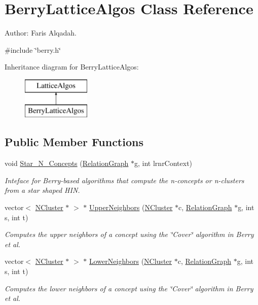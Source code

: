 \hypertarget{class_berry_lattice_algos}{
\section{BerryLatticeAlgos Class Reference}
\label{class_berry_lattice_algos}
}


Author: Faris Alqadah.  




{\ttfamily \#include \char`\"{}berry.h\char`\"{}}

Inheritance diagram for BerryLatticeAlgos:\begin{figure}[H]
\begin{center}
\leavevmode
\includegraphics[height=2.000000cm]{class_berry_lattice_algos}
\end{center}
\end{figure}
\subsection*{Public Member Functions}
\begin{DoxyCompactItemize}
\item 
void \hyperlink{class_berry_lattice_algos_aa740db0f43531fc872f94c062efe59b9}{Star\_\-N\_\-Concepts} (\hyperlink{class_relation_graph}{RelationGraph} $\ast$g, int lrnrContext)
\begin{DoxyCompactList}\small\item\em Inteface for Berry-\/based algorithms that compute the n-\/concepts or n-\/clusters from a star shaped HIN. \item\end{DoxyCompactList}\item 
vector$<$ \hyperlink{class_n_cluster}{NCluster} $\ast$ $>$ $\ast$ \hyperlink{class_berry_lattice_algos_a22c1daa784e7bf5017a40b313fcec221}{UpperNeighbors} (\hyperlink{class_n_cluster}{NCluster} $\ast$c, \hyperlink{class_relation_graph}{RelationGraph} $\ast$g, int s, int t)
\begin{DoxyCompactList}\small\item\em Computes the upper neighbors of a concept using the \char`\"{}Cover\char`\"{} algorithm in Berry et al. \item\end{DoxyCompactList}\item 
vector$<$ \hyperlink{class_n_cluster}{NCluster} $\ast$ $>$ $\ast$ \hyperlink{class_berry_lattice_algos_af33af014732c42bf75864cb492184104}{LowerNeighbors} (\hyperlink{class_n_cluster}{NCluster} $\ast$c, \hyperlink{class_relation_graph}{RelationGraph} $\ast$g, int s, int t)
\begin{DoxyCompactList}\small\item\em Computes the lower neighbors of a concept using the \char`\"{}Cover\char`\"{} algorithm in Berry et al. \item\end{DoxyCompactList}\end{DoxyCompactItemize}

